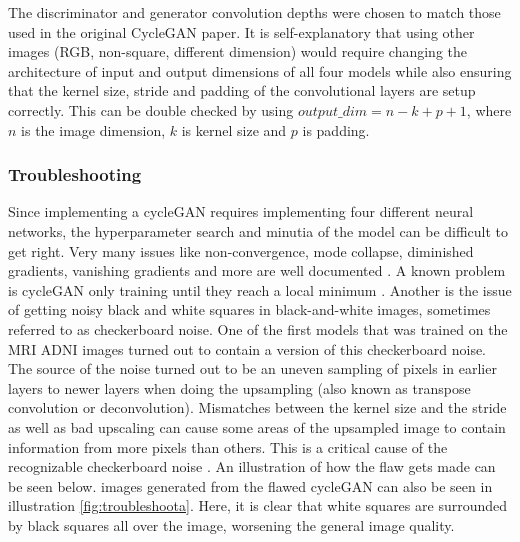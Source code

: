 \documentclass[12pt, fleqn, titlepage]{article}
\begin{document}
The discriminator and generator convolution depths were chosen to match those used in the original CycleGAN paper. It is self-explanatory that using other images (RGB, non-square, different dimension) would require changing the architecture of input and output dimensions of all four models while also ensuring that the kernel size, stride and padding of the convolutional layers are setup correctly. This can be double checked by using $output\_dim = n - k + p + 1$, where $n$ is the image dimension, $k$ is kernel size and $p$ is padding.

\subsubsection{Troubleshooting}\label{troubleshooting}%
Since implementing a cycleGAN requires implementing four different neural networks, the hyperparameter search and minutia of the model can be difficult to get right. Very many issues like non-convergence, mode collapse, diminished gradients, vanishing gradients and more are well documented \cite{hard_to_train}. A known problem is cycleGAN only training until they reach a local minimum \cite{ganlocalminimum}. Another is the issue of getting noisy black and white squares in black-and-white images, sometimes referred to as checkerboard noise. One of the first models that was trained on the MRI ADNI images turned out to contain a version of this checkerboard noise. The source of the noise turned out to be an uneven sampling of pixels in earlier layers to newer layers when doing the upsampling (also known as transpose convolution or deconvolution). Mismatches between the kernel size and the stride as well as bad upscaling can cause some areas of the upsampled image to contain information from more pixels than others. This is a critical cause of the recognizable checkerboard noise \cite{checkerboard}. An illustration of how the flaw gets made can be seen below. images generated from the flawed cycleGAN can also be seen in illustration \ref{fig:troubleshoota}. Here, it is clear that white squares are surrounded by black squares all over the image, worsening the general image quality.
\end{document}
